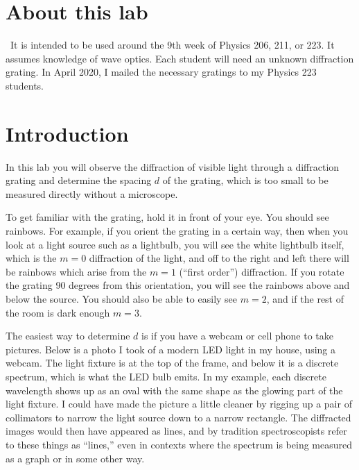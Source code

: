 \addtocounter{chapter}{-1}
\renewcommand\thechapter{c3.9a}
\label{lab:grating}

\section*{About this lab}

\covid\ 
It is intended to be used around the 9th week of Physics 206, 211, or 223.
It assumes knowledge of wave optics.
Each student will need an unknown diffraction grating. In April 2020, I mailed
the necessary gratings to my Physics 223 students.

\section{Introduction}

In this lab you will observe the diffraction of visible light through a diffraction grating and determine the spacing $d$ of the grating,
which is too small to be measured directly without a microscope.

To get familiar with the grating, hold it in front of your eye. You should see rainbows. For example, if you orient the grating
in a certain way, then when you look at a light source such as a lightbulb, you will see the white lightbulb itself, which is the
$m=0$ diffraction of the light, and off to the right and left there will be rainbows which arise from the $m=1$ (``first order'') diffraction.
If you rotate the grating 90 degrees from this orientation, you will see the rainbows above and below the source. You should
also be able to easily see $m=2$, and if the rest of the room is dark enough $m=3$.

The easiest way to determine $d$ is if you have a webcam or cell phone to take pictures. Below is a photo I took of a modern LED light
in my house, using a webcam. The light fixture is at the top of the frame, and below it is a discrete spectrum, which is what the LED bulb emits.
In my example, each discrete wavelength shows up as an oval with the same shape as the glowing part of the light fixture.
I could have made the picture a little cleaner by rigging up a pair of collimators to narrow the light source down to a narrow
rectangle. The diffracted images would then have appeared as lines, and by tradition spectroscopists refer to these things as ``lines,''
even in contexts where the spectrum is being measured as a graph or in some other way.


